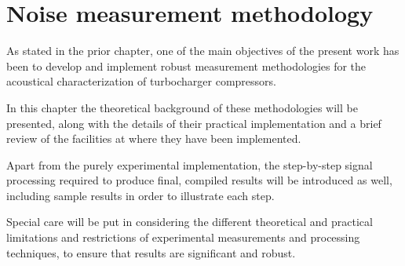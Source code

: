 \chapter{Noise measurement methodology} \label{cap:metod}



\noindent As stated in the prior chapter, one of the main objectives of the present work has been to develop and implement robust measurement methodologies for the acoustical characterization of turbocharger compressors.

In this chapter the theoretical background of these methodologies will be presented, along with the details of their practical implementation and a brief review of the facilities at where they have been implemented.

Apart from the purely experimental implementation, the step-by-step signal processing required to produce final, compiled results will be introduced as well, including sample results in order to illustrate each step.

Special care will be put in considering the different theoretical and practical limitations and restrictions of experimental measurements and processing techniques, to ensure that results are significant and robust.

